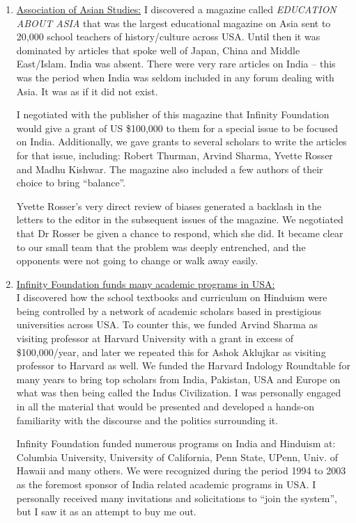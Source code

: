 \begin{enumerate}
\item \underline{Association of Asian Studies:} I discovered a magazine called \textit{EDUCATION ABOUT ASIA} that was the largest educational magazine on Asia sent to 20,000 school teachers of history/culture across USA. Until then it was dominated by articles that spoke well of Japan, China and Middle East/Islam. India was absent. There were very rare articles on India – this was the period when India was seldom included in any forum dealing with Asia. It was as if it did not exist.

I negotiated with the publisher of this magazine that Infinity Foundation would give a grant of US \$100,000 to them for a special issue to be focused on India. Additionally, we gave grants to several scholars to write the articles for that issue, including: Robert Thurman, Arvind Sharma, Yvette Rosser and Madhu Kishwar. The magazine also included a few authors of their choice to bring “balance”.

Yvette Rosser’s very direct review of biases generated a backlash in the letters to the editor in the subsequent issues of the magazine. We negotiated that Dr Rosser be given a chance to respond, which she did. It became clear to our small team that the problem was deeply entrenched, and the opponents were not going to change or walk away easily.

\item \underline{Infinity Foundation funds many academic programs in USA:}\\ I discovered how the school textbooks and curriculum on Hinduism were being controlled by a network of academic scholars based in prestigious universities across USA. To counter this, we funded Arvind Sharma as visiting professor at Harvard University with a grant in excess of \$100,000/year, and later we repeated this for Ashok Aklujkar as visiting professor to Harvard as well. We funded the Harvard Indology Roundtable for many years to bring top scholars from India, Pakistan, USA and Europe on what was then being called the Indus Civilization. I was personally engaged in all the material that would be presented and developed a hands-on familiarity with the discourse and the politics surrounding it.

Infinity Foundation funded numerous programs on India and Hinduism at: Columbia University, University of California, Penn State, UPenn, Univ. of Hawaii and many others. We were recognized during the period 1994 to 2003 as the foremost sponsor of India related academic programs in USA. I personally received many invitations and solicitations to “join the system”, but I saw it as an attempt to buy me out.


\end{enumerate}
